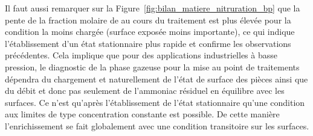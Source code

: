 Il faut aussi remarquer sur la Figure~\ref{fig:bilan_matiere_nitruration_bp} que la pente de la fraction molaire de  au cours du traitement est plus élevée pour la condition la moins chargée (surface exposée moins importante), ce qui indique l'établissement d'un état stationnaire plus rapide et confirme les observations précédentes. Cela implique que pour des applications industrielles à basse pression, le diagnostic de la phase gazeuse pour la mise au point de traitements dépendra du chargement \textendash{} et naturellement de l'état de surface des pièces \textendash{} ainsi que du débit et donc pas seulement de l'ammoniac résiduel en équilibre avec les surfaces. Ce n'est qu'après l'établissement de l'état stationnaire qu'une condition aux limites de type concentration constante est possible. De cette manière l'enrichissement se fait globalement avec une condition transitoire sur les surfaces.


